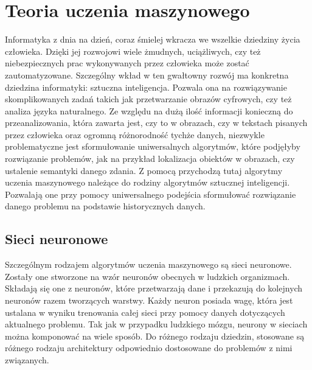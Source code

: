 \newpage
\section{Teoria uczenia maszynowego}
Informatyka z dnia na dzień, coraz śmielej wkracza we wszelkie dziedziny życia człowieka. Dzięki jej rozwojowi wiele żmudnych, uciążliwych, czy też niebezpiecznych prac wykonywanych przez człowieka może zostać zautomatyzowane. Szczególny wkład w ten gwałtowny rozwój ma konkretna dziedzina informatyki: sztuczna inteligencja. Pozwala ona na rozwiązywanie skomplikowanych zadań takich jak przetwarzanie obrazów cyfrowych, czy też analiza języka naturalnego. Ze względu na dużą ilość informacji konieczną do przeanalizowania, która zawarta jest, czy to w obrazach, czy w tekstach pisanych przez człowieka oraz ogromną różnorodność tychże danych, niezwykle problematyczne jest sformułowanie uniwersalnych algorytmów, które podjęłyby rozwiązanie problemów, jak na przykład lokalizacja obiektów w obrazach, czy ustalenie semantyki danego zdania. Z pomocą przychodzą tutaj algorytmy uczenia maszynowego należące do rodziny algorytmów sztucznej inteligencji. Pozwalają one przy pomocy uniwersalnego podejścia sformułować rozwiązanie danego problemu na podstawie historycznych danych.
\subsection{Sieci neuronowe}
Szczególnym rodzajem algorytmów uczenia maszynowego są sieci neuronowe. Zostały one stworzone na wzór neuronów obecnych w ludzkich organizmach. Składają się one z neuronów, które przetwarzają dane i przekazują do kolejnych neuronów razem tworzących warstwy. Każdy neuron posiada wagę, która jest ustalana w wyniku trenowania całej sieci przy pomocy danych dotyczących aktualnego problemu. Tak jak w przypadku ludzkiego mózgu, neurony w sieciach można komponować na wiele sposób. Do różnego rodzaju dziedzin, stosowane są różnego rodzaju architektury odpowiednio dostosowane do problemów z nimi związanych.
